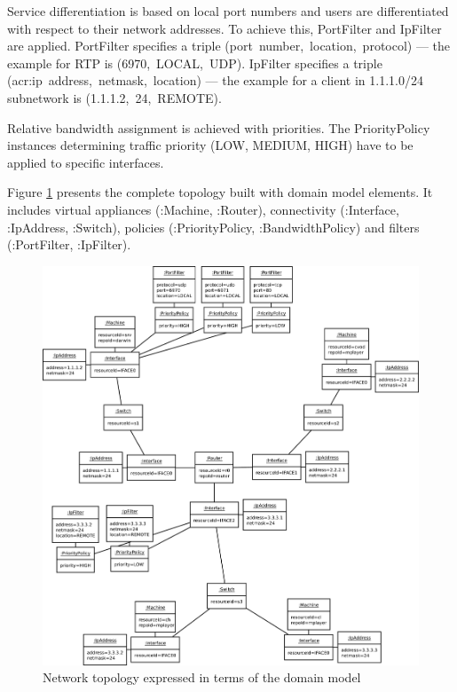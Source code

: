 \documentclass[11pt]{book}
\begin{document}
        Service differentiation is based on local port numbers and users are differentiated with respect to their
        network addresses. To achieve this, PortFilter and IpFilter are applied. PortFilter specifies a triple
        \mbox{(port number, location, protocol)} --- the example for RTP is \mbox{(6970, LOCAL, UDP)}. IpFilter
        specifies a triple \mbox{(\gls{acr:ip} address, netmask, location)} --- the example for a client in 1.1.1.0/24 subnetwork
        is \mbox{(1.1.1.2, 24, REMOTE)}.

        Relative bandwidth assignment is achieved with priorities. The PriorityPolicy instances determining traffic
        priority (LOW, MEDIUM, HIGH) have to be applied to specific interfaces.

        Figure \ref{fig:cs:topo} presents the complete topology built with domain model elements. It includes virtual
        appliances (:Machine, :Router), connectivity (:Interface, :IpAddress, :Switch), policies (:PriorityPolicy,
        :BandwidthPolicy) and filters (:PortFilter, :IpFilter).

        \begin{figure}[H]
          \includegraphics[width=.9\textwidth]{img/test-case/topology-om.pdf}

          \caption{Network topology expressed in terms of the domain model}
          \label{fig:cs:topo}
        \end{figure}
\end{document}
